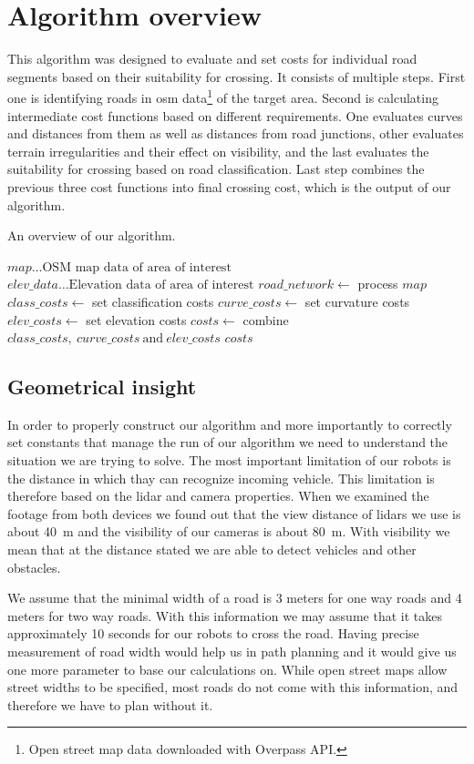 \documentclass[oneside]{article}
\begin{document}
    \section{Algorithm overview}
    This algorithm was designed to evaluate and set costs for individual road segments based on their suitability for crossing. It consists of multiple steps. First one is identifying roads in osm data\footnote{Open street map data downloaded with Overpass API.} of the target area. Second is calculating intermediate cost functions based on different requirements. One evaluates curves and distances from them as well as distances from road junctions, other evaluates terrain irregularities and their effect on visibility, and the last evaluates the suitability for crossing based on road classification. Last step combines the previous three cost functions into final crossing cost, which is the output of our algorithm.
    \begin{algorithm}
    \caption{An overview of our algorithm.}
    \begin{algorithmic}
    \Require $map \ldots \textrm{OSM map data of area of interest}$
    \Require $elev\_data \ldots \textrm{Elevation data of area of interest}$
    \State $road\_network \gets$ process $map$
    \State $class\_costs \gets$ set classification costs
    \State $curve\_costs \gets$ set curvature costs
    \State $elev\_costs \gets$ set elevation costs
    \State $costs \gets$ combine $class\_costs,\ curve\_costs\ \textrm{and}\ elev\_costs$
    \Ensure $costs$
    \end{algorithmic}
    \end{algorithm}

        \subsection*{Geometrical insight}
        In order to properly construct our algorithm and more importantly to correctly set constants that manage the run of our algorithm we need to understand the situation we are trying to solve. The most important limitation of our robots is the distance in which thay can recognize incoming vehicle. This limitation is therefore based on the lidar and camera properties. When we examined the footage from both devices we found out that the view distance of lidars we use is about 40~m and the visibility of our cameras is about 80~m. With visibility we mean that at the distance stated we are able to detect vehicles and other obstacles.

        We assume that the minimal width of a road is 3 meters for one way roads and 4 meters for two way roads. With this information we may assume that it takes approximately 10 seconds for our robots to cross the road. Having precise measurement of road width would help us in path planning and it would give us one more parameter to base our calculations on. While open street maps allow street widths to be specified, most roads do not come with this information, and therefore we have to plan without it.
\end{document}
